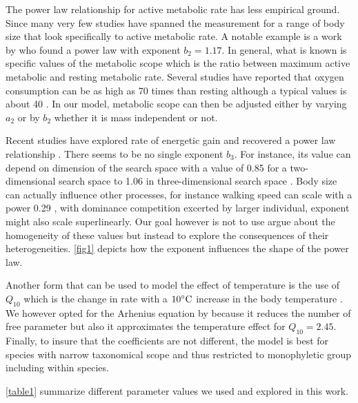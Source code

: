 The power law relationship for active metabolic rate has less empirical ground.
Since many very few studies have spanned the measurement for a range of body size that look specifically to active metabolic rate.
A notable example is a work by \citet{Bartholomew1978} who found a power law with exponent $b_2 = 1.17$.
In general, what is known is specific values of the metabolic scope which is the ratio between maximum active metabolic and resting metabolic rate.
Several studies have reported that oxygen consumption can be as high as 70 times than resting although a typical values is about 40 \citep{Bartholomew1981}.  
In our model, metabolic scope can then be adjusted either by varying $a_2$  or by $b_2$ whether it is mass independent or not. 

Recent studies have explored rate of energetic gain and recovered a power law relationship \citep{Maino2015, Pawar2012}.
There seems to be no single exponent $b_3$.
For instance, its value can depend on dimension of the search space with a value of 0.85 for a two-dimensional search space to 1.06 in three-dimensional search space \citep{Pawar2012}.
Body size can actually influence other processes, for instance walking speed  can scale with a power 0.29 \citep{Peters1986}, with dominance competition excerted by larger individual, exponent might also scale superlinearly.
Our goal however is not to use argue about the homogeneity of these values but instead to explore the consequences of their heterogeneities.
\cref{fig1} depicts how the exponent influences the shape of the power law.

Another form that can be used to model the effect of temperature is the use of $Q_{10}$ which is the change in rate with a $10^ {\circ} \rm{C}$ increase in the body temperature \citep{Precht1973}.
We however opted for the Arhenius equation by \citet{Brown2004} because it reduces the number of free parameter but also it approximates the temperature effect for $Q_10 = 2.45$.  
Finally, to  insure that the coefficients are not different, the model is best for species with narrow taxonomical scope and thus restricted to monophyletic group including within species. 

\cref{table1} summarize different parameter values we used and explored in this work.

